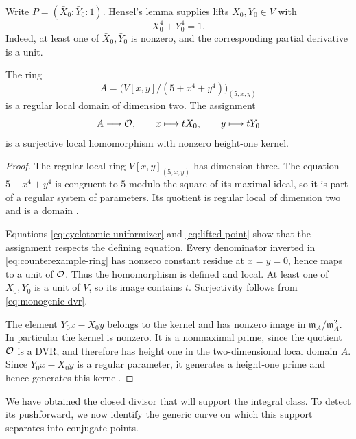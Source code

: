 Write $P=(\bar X_0:\bar Y_0:1)$. Hensel's lemma supplies lifts
$X_0,Y_0\in V$ with
\begin{equation}
\label{eq:lifted-point}
    X_0^4+Y_0^4=1.
\end{equation}
Indeed, at least one of $\bar X_0,\bar Y_0$ is nonzero, and the
corresponding partial derivative is a unit.

\begin{lemma}
\label{lem:local-ring}
The ring
\begin{equation}
\label{eq:counterexample-ring}
    A=\bigl(V[x,y]/(5+x^4+y^4)\bigr)_{(5,x,y)}
\end{equation}
is a regular local domain of dimension two. The assignment
\begin{equation}
\label{eq:closed-divisor-map}
    A\longrightarrow\mathcal O,\qquad
    x\longmapsto tX_0,\qquad y\longmapsto tY_0
\end{equation}
is a surjective local homomorphism with nonzero height-one kernel.
\end{lemma}

\begin{proof}
The regular local ring $V[x,y]_{(5,x,y)}$ has dimension three. The
equation $5+x^4+y^4$ is congruent to $5$ modulo the square of its
maximal ideal, so it is part of a regular system of parameters.
Its quotient is regular local of dimension two and is a domain
\cite[Tags \texttt{00NQ} and \texttt{00NP}]{StacksProject}.

Equations \eqref{eq:cyclotomic-uniformizer} and
\eqref{eq:lifted-point} show that the assignment respects the defining
equation. Every denominator inverted in \eqref{eq:counterexample-ring}
has nonzero constant residue at $x=y=0$, hence maps to a unit of
$\mathcal O$. Thus the homomorphism is defined and local. At least one of
$X_0,Y_0$ is a unit of $V$, so its image contains $t$. Surjectivity
follows from \eqref{eq:monogenic-dvr}.

The element $Y_0x-X_0y$ belongs to the kernel and has nonzero image in
$\mathfrak m_A/\mathfrak m_A^2$. In particular the kernel is nonzero.
It is a nonmaximal prime, since the quotient $\mathcal O$ is a DVR, and
therefore has height one in the two-dimensional local domain $A$.
Since $Y_0x-X_0y$ is a regular parameter, it generates a height-one
prime and hence generates this kernel.
\end{proof}

We have obtained the closed divisor that will support the integral
class. To detect its pushforward, we now identify the generic curve
on which this support separates into conjugate points.

